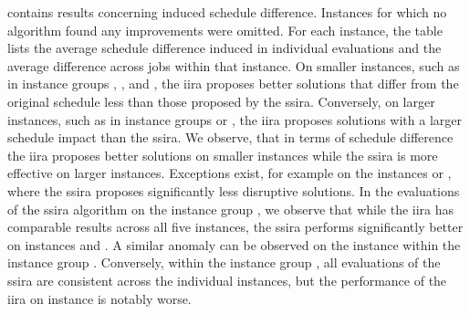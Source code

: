 


 contains results concerning induced schedule difference.
Instances for which no algorithm found any improvements were omitted.
For each instance, the table lists
the average schedule difference induced in individual evaluations
and the average difference across jobs within that instance.
On smaller instances, such as in instance groups , , and ,
the \ac{iira} proposes better solutions that differ from the original schedule
less than those proposed by the \ac{ssira}.
Conversely, on larger instances, such as in instance groups  or ,
the \ac{iira} proposes solutions with a larger schedule impact than the \ac{ssira}.
We observe, that in terms of schedule difference
the \ac{iira} proposes better solutions on smaller instances while
the \ac{ssira} is more effective on larger instances.
Exceptions exist, for example on the instances  or ,
where the \ac{ssira} proposes significantly less disruptive solutions.
In the evaluations of the \ac{ssira} algorithm on the instance group ,
we observe that while the \ac{iira} has comparable results across all five instances,
the \ac{ssira} performs significantly better on instances  and .
A similar anomaly can be observed on the instance  within the instance group .
Conversely, within the instance group ,
all evaluations of the \ac{ssira} are consistent across the individual instances,
but the performance of the \ac{iira} on instance  is notably worse.

